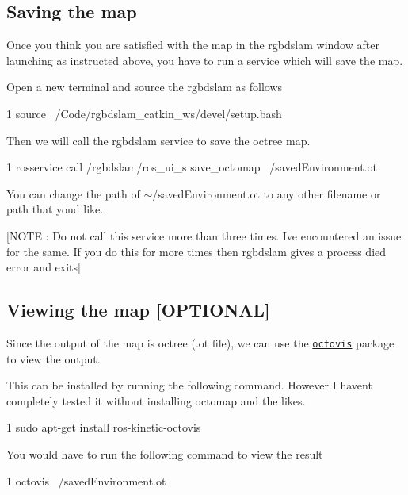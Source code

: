 \subsection*{Saving the map}

Once you think you are satisfied with the map in the rgbdslam window after launching as instructed above, you have to run a service which will save the map.

Open a new terminal and source the rgbdslam as follows


\begin{DoxyCode}
1 source ~/Code/rgbdslam\_catkin\_ws/devel/setup.bash
\end{DoxyCode}


Then we will call the rgbdslam service to save the octree map.


\begin{DoxyCode}
1 rosservice call /rgbdslam/ros\_ui\_s save\_octomap ~/savedEnvironment.ot
\end{DoxyCode}


You can change the path of {\ttfamily $\sim$/saved\+Environment.ot} to any other filename or path that you\textquotesingle{}d like.

\mbox{[}N\+O\+TE \+: Do not call this service more than three times. I\textquotesingle{}ve encountered an issue for the same. If you do this for more times then rgbdslam gives a process died error and exits\mbox{]}

\subsection*{Viewing the map \mbox{[}O\+P\+T\+I\+O\+N\+AL\mbox{]}}

Since the output of the map is octree (.ot file), we can use the \href{http://wiki.ros.org/octovis}{\tt octovis} package to view the output.

This can be installed by running the following command. However I haven\textquotesingle{}t completely tested it without installing octomap and the likes.


\begin{DoxyCode}
1 sudo apt-get install ros-kinetic-octovis
\end{DoxyCode}


You would have to run the following command to view the result


\begin{DoxyCode}
1 octovis ~/savedEnvironment.ot
\end{DoxyCode}


